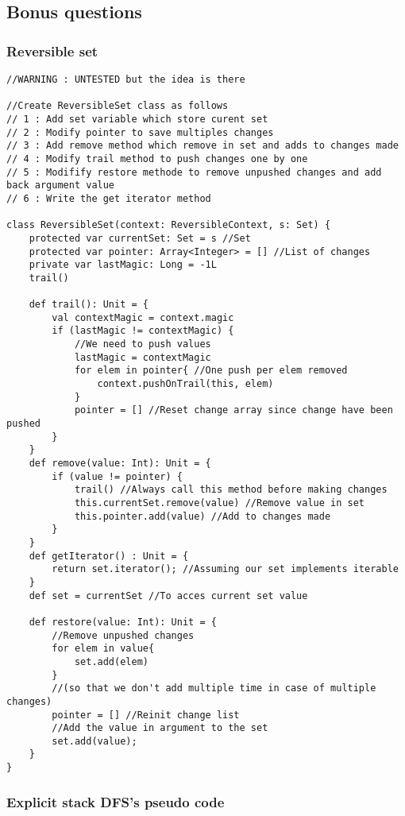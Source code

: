 \subsection{Bonus questions}

\subsubsection{Reversible set}

\begin{lstlisting}
//WARNING : UNTESTED but the idea is there

//Create ReversibleSet class as follows
// 1 : Add set variable which store curent set
// 2 : Modify pointer to save multiples changes
// 3 : Add remove method which remove in set and adds to changes made
// 4 : Modify trail method to push changes one by one
// 5 : Modifify restore methode to remove unpushed changes and add back argument value
// 6 : Write the get iterator method

class ReversibleSet(context: ReversibleContext, s: Set) {
	protected var currentSet: Set = s //Set
	protected var pointer: Array<Integer> = [] //List of changes
	private var lastMagic: Long = -1L
	trail()
	
	def trail(): Unit = {
		val contextMagic = context.magic
		if (lastMagic != contextMagic) {
			//We need to push values
			lastMagic = contextMagic
			for elem in pointer{ //One push per elem removed
				context.pushOnTrail(this, elem)
			}
			pointer = [] //Reset change array since change have been pushed
		}
	}
	def remove(value: Int): Unit = {
		if (value != pointer) {
			trail() //Always call this method before making changes
			this.currentSet.remove(value) //Remove value in set
			this.pointer.add(value) //Add to changes made
		}
	}
	def getIterator() : Unit = {
		return set.iterator(); //Assuming our set implements iterable
	}
	def set = currentSet //To acces current set value
	
	def restore(value: Int): Unit = {
		//Remove unpushed changes
		for elem in value{
			set.add(elem)
		}
		//(so that we don't add multiple time in case of multiple changes)
		pointer = [] //Reinit change list 
		//Add the value in argument to the set
		set.add(value);
	}
}
\end{lstlisting}

\subsubsection{Explicit stack DFS's pseudo code}

